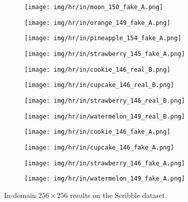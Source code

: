 \documentclass[10pt,twocolumn,letterpaper]{article}
\begin{document}
\begin{figure*}[tbp]
\begin{center}
  \begin{subfigure}[b]{\hrwidth\linewidth}
  \texttt{[image: img/hr/in/moon\_150\_fake\_A.png]}
  \end{subfigure}
  \begin{subfigure}[b]{\hrwidth\linewidth}
  \texttt{[image: img/hr/in/orange\_149\_fake\_A.png]}
  \end{subfigure}
\begin{subfigure}[b]{\hrwidth\linewidth}
  \texttt{[image: img/hr/in/pineapple\_154\_fake\_A.png]}
  \end{subfigure}
  \begin{subfigure}[b]{\hrwidth\linewidth}
  \texttt{[image: img/hr/in/strawberry\_145\_fake\_A.png]}
  \end{subfigure}

  \begin{subfigure}[b]{\hrwidth\linewidth}
  \texttt{[image: img/hr/in/cookie\_146\_real\_B.png]}
  \end{subfigure}
  \begin{subfigure}[b]{\hrwidth\linewidth}
  \texttt{[image: img/hr/in/cupcake\_146\_real\_B.png]}
  \end{subfigure}
\begin{subfigure}[b]{\hrwidth\linewidth}
  \texttt{[image: img/hr/in/strawberry\_146\_real\_B.png]}
  \end{subfigure}
  \begin{subfigure}[b]{\hrwidth\linewidth}
  \texttt{[image: img/hr/in/watermelon\_149\_real\_B.png]}
  \end{subfigure}

  \begin{subfigure}[b]{\hrwidth\linewidth}
  \texttt{[image: img/hr/in/cookie\_146\_fake\_A.png]}
  \end{subfigure}
  \begin{subfigure}[b]{\hrwidth\linewidth}
  \texttt{[image: img/hr/in/cupcake\_146\_fake\_A.png]}
  \end{subfigure}
\begin{subfigure}[b]{\hrwidth\linewidth}
  \texttt{[image: img/hr/in/strawberry\_146\_fake\_A.png]}
  \end{subfigure}
  \begin{subfigure}[b]{\hrwidth\linewidth}
  \texttt{[image: img/hr/in/watermelon\_149\_fake\_A.png]}
  \end{subfigure}
  
\end{center}
\caption{In-domain $256\times 256$ results on the Scribble dataset.}
 \label{fig:in_res}
\end{figure*}


{\small


}
\end{document}
